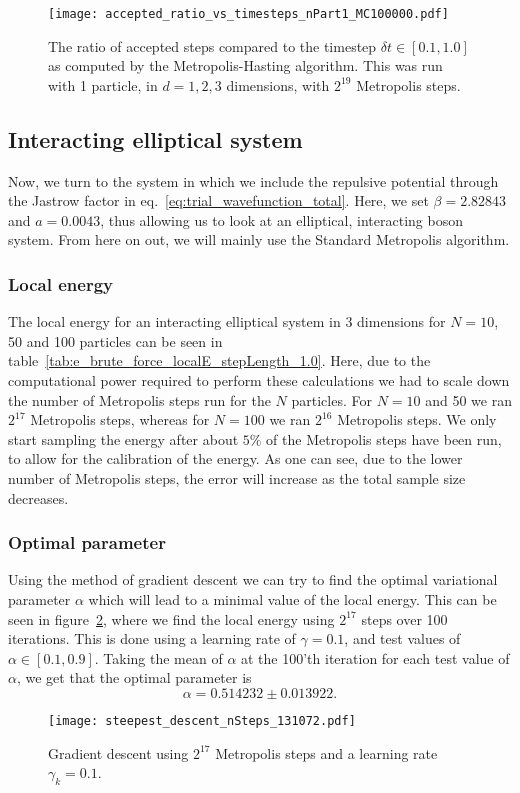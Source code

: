 \documentclass[
    a4paper, aps, twocolumn, floatfix, superscriptaddress,
    nofootinbib]{revtex4-1}
\begin{document}
\begin{figure}[h!]
    \centering
    \texttt{[image: accepted\_ratio\_vs\_timesteps\_nPart1\_MC100000.pdf]}
    \caption{The ratio of accepted steps compared to the timestep $\delta t\in [0.1, 1.0]$ as computed by the Metropolis-Hasting algorithm. This was run with 1 particle, in $d = 1, 2, 3$ dimensions, with $2^{19}$ Metropolis steps.}
    \label{fig:c_importance_acceptance_ratio_timesteps}
\end{figure}

\subsection{Interacting elliptical system}
Now, we turn to the system in which we include the repulsive potential through the Jastrow factor in eq.~\eqref{eq:trial_wavefunction_total}. Here, we set $\beta = 2.82843$ and $a=0.0043$, thus allowing us to look at an elliptical, interacting boson system. From here on out, we will mainly use the Standard Metropolis algorithm.

\subsubsection{Local energy}
The local energy for an interacting elliptical system in 3 dimensions for $N=10$, 50 and 100 particles can be seen in table~\ref{tab:e_brute_force_localE_stepLength_1.0}. Here, due to the computational power required to perform these calculations we had to scale down the number of Metropolis steps run for the $N$ particles. For $N=10$ and 50 we ran $2^{17}$ Metropolis steps, whereas for $N=100$ we ran $2^{16}$ Metropolis steps. We only start sampling the energy after about $5\%$ of the Metropolis steps have been run, to allow for the calibration of the energy.
As one can see, due to the lower number of Metropolis steps, the error will increase as the total sample size decreases.


\subsubsection{Optimal parameter}
Using the method of gradient descent we can try to find the optimal variational parameter $\alpha$ which will lead to a minimal value of the local energy. This can be seen in figure~\ref{fig:f_gradient_descent}, where we find the local energy using $2^{17}$ steps over 100 iterations. This is done using a learning rate of $\gamma = 0.1$, and test values of $\alpha \in [0.1, 0.9]$.
Taking the mean of $\alpha$ at the 100'th iteration for each test value of $\alpha$, we get that the optimal parameter is $$\alpha = 0.514232 \pm 0.013922.$$
\begin{figure}[h!]
    \centering
    \texttt{[image: steepest\_descent\_nSteps\_131072.pdf]}
    \caption{Gradient descent using $2^{17}$ Metropolis steps and a learning rate $\gamma_k = 0.1$.}
    \label{fig:f_gradient_descent}
\end{figure}
\end{document}
